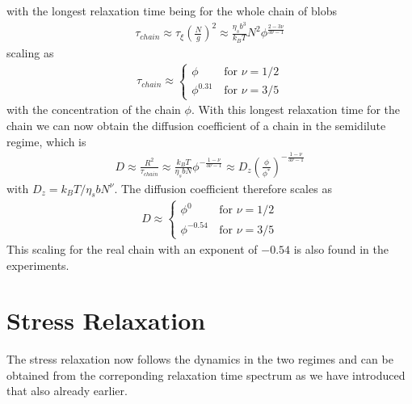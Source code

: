 \documentclass[letterpaper,10pt,english]{sphinxmanual}
\begin{document}
\sphinxAtStartPar
with the longest relaxation time being for the whole chain of blobs
\begin{equation*}
\begin{split}\tau_{chain}\approx \tau_{\xi}\left ( \frac{N}{g}\right )^{2}\approx \frac{\eta_s b^{3}}{k_B T}N^2 \phi^{\frac{2-3\nu}{3\nu-1}}\end{split}
\end{equation*}
\sphinxAtStartPar
scaling as
\begin{equation*}
\begin{split}\tau_{chain}\approx \begin{cases}
\phi\, & \text{for } \nu=1/2\\
\phi^{0.31}\, & \text{for } \nu=3/5
\end{cases}\end{split}
\end{equation*}
\sphinxAtStartPar
with the concentration of the chain \(\phi\). With this longest relaxation time for the chain we can now obtain the diffusion coefficient of a chain in the semi\sphinxhyphen{}dilute regime, which is
\begin{equation*}
\begin{split}D\approx \frac{R^2}{\tau_{chain}}\approx \frac{k_B T}{\eta_s b N} \phi^{-\frac{1-\nu}{3\nu -1}}\approx D_{z}\left (\frac{\phi}{\phi^{*}}\right )^{-\frac{1-\nu}{3\nu-1}}\end{split}
\end{equation*}
\sphinxAtStartPar
with \(D_z=k_B T/\eta_s b N^{\nu}\). The diffusion coefficient therefore scales as
\begin{equation*}
\begin{split}D\approx \begin{cases}
\phi^{0}\, & \text{for } \nu=1/2\\
\phi^{-0.54}\, & \text{for } \nu=3/5
\end{cases}\end{split}
\end{equation*}
\sphinxAtStartPar
This scaling for the real chain with an exponent of \(-0.54\) is also found in the experiments.

\sphinxAtStartPar
{}


\section{Stress Relaxation}
\label{\detokenize{notebooks/L26/1_semidilute_polymers:Stress-Relaxation}}
\sphinxAtStartPar
The stress relaxation now follows the dynamics in the two regimes and can be obtained from the correponding relaxation time spectrum as we have introduced that also already earlier.
\end{document}
